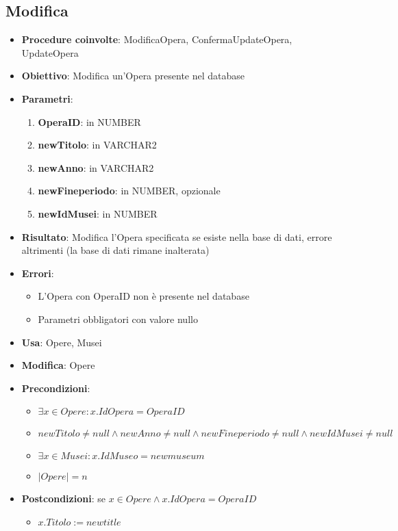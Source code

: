 \subsection{Modifica}
\begin{itemize}
	\item \textbf{Procedure coinvolte}: ModificaOpera, ConfermaUpdateOpera, UpdateOpera
	\item \textbf{Obiettivo}: Modifica un'Opera presente nel database
	\item \textbf{Parametri}:
	\begin{enumerate}
		\item \textbf{OperaID}: in NUMBER
		\item \textbf{newTitolo}: in VARCHAR2
		\item \textbf{newAnno}: in VARCHAR2
		\item \textbf{newFineperiodo}: in NUMBER, opzionale
		\item \textbf{newIdMusei}: in NUMBER
	\end{enumerate}
	\item \textbf{Risultato}: Modifica l'Opera specificata se esiste nella base di dati, errore altrimenti (la base di dati rimane inalterata)
	\item \textbf{Errori}: 
	\begin{itemize}
		\item L'Opera con OperaID non è presente nel database
		\item Parametri obbligatori con valore nullo
	\end{itemize}
	\item \textbf{Usa}: Opere, Musei
	\item \textbf{Modifica}: Opere
	\item \textbf{Precondizioni}:
	\begin{itemize}
		\item $\exists x \in Opere : x.IdOpera = OperaID$
		\item $newTitolo \ne null \land newAnno \ne null \land newFineperiodo \ne null \land newIdMusei \ne null$
		\item $\exists x \in Musei : x.IdMuseo = newmuseum$
		\item $|Opere| = n$
	\end{itemize}
	\item \textbf{Postcondizioni}: se $x \in Opere \land x.IdOpera = OperaID$
	\begin{itemize}
		\item $x.Titolo := newtitle$

\end{itemize}
\end{itemize}

